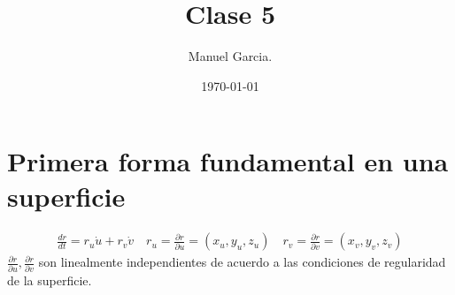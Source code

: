 \documentclass{article}
\title{Clase 5 }
\author{Manuel Garcia.}
\date{\today}
\newcommand{\caja}[3]{%
  \begin{tcolorbox}[colback=#1!5!white,colframe=#1!25!black,title=#2]
    #3
  \end{tcolorbox}%
}
\begin{document}
\maketitle

\section{Primera forma fundamental en una superficie }
\caja{green}{Tangente a la curva }{
  \begin{gather}
    \frac{d r }{d t} = r_u \dot u + r_v \dot v \quad r_u = \frac{\partial r }{\partial u} = (x_u,y_u,z_u) \quad r_v = \frac{\partial r }{\partial v} = (x_v,y_v,z_v) 
  \end{gather}
  $ \frac{\partial r }{\partial u}, \frac{\partial r }{\partial v} $ son linealmente independientes de acuerdo a las condiciones de regularidad de la superficie.
}
\end{document}
